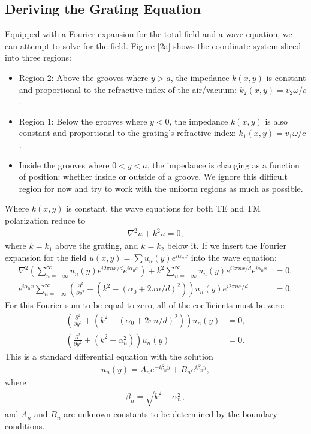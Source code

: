 \subsection{Deriving the Grating Equation}
Equipped with a Fourier expansion for the total field and a wave equation, we can attempt to solve for the field.  Figure \ref{2a} shows the coordinate system sliced into three regions: 
\begin{itemize}
\item Region 2: Above the grooves where $y>a$, the impedance $k(x, y)$ is constant and proportional to the refractive index of the air/vacuum: $k_2(x, y)=v_2 \omega/c$.
\item Region 1: Below the grooves where $y<0$, the impedance $k(x,y)$ is also constant and proportional to the grating's refractive index: $k_1(x,y)=v_1 \omega /c$.
\item Inside the grooves where $0<y<a$, the impedance is changing as a function of position: whether inside or outside of a groove.  We ignore this difficult region for now and try to work with the uniform regions as much as possible.
\end{itemize}
Where $k(x,y)$ is constant, the wave equations for both TE  and TM polarization  reduce to
\begin{align}
\nabla^2 u + k^2 u = 0,
\end{align}
where $k=k_1$ above the grating, and $k=k_2$ below it.  If we insert the Fourier expansion for the field $u(x,y)=\sum u_n(y) e^{i\alpha_n x}$ into the wave equation:
\begin{align}
\nabla^2 \left( \sum_{n=-\infty}^{\infty} u_n(y) e^{i2\pi nx/d}e^{i\alpha_0 x} \right) + k^2 \sum_{n=-\infty}^{\infty} u_n(y) e^{i2\pi n x/d}e^{i\alpha_0 x} &= 0, \\
e^{i \alpha_0 x} \sum_{n=-\infty}^{\infty}  \left( \frac{\partial^2}{\partial y^2} + (k^2 - (\alpha_0+2\pi n/d)^2) \right) u_n(y) e^{i2\pi n x/d} &= 0.
\end{align}
For this Fourier sum to be equal to zero, all of the coefficients must be zero:
\begin{align}
\left( \frac{\partial^2}{\partial y^2} + (k^2 - (\alpha_0+2\pi n/d)^2) \right) u_n(y) &= 0,\\
\left( \frac{\partial^2}{\partial y^2} + (k^2 - \alpha_n^2) \right) u_n(y) &= 0.
\end{align}
This is a standard differential equation with the solution
\begin{align}
u_n(y) = A_n e^{-i\beta_n y}+ B_n e^{i\beta_n y},
\end{align}
where 
\begin{align}
\beta_n = \sqrt{k^2 - \alpha_n^2},
\end{align}
and $A_n$ and $B_n$ are unknown constants to be determined by the boundary conditions.

